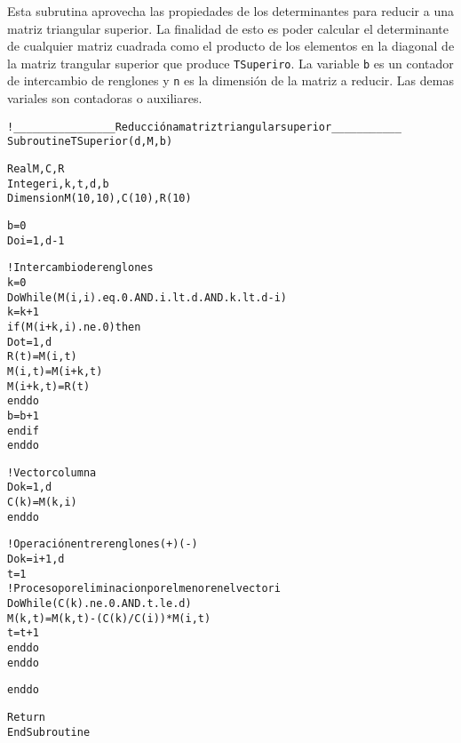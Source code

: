 \documentclass[a4paper]{scrartcl}
\begin{document}
Esta subrutina aprovecha las propiedades de los determinantes para reducir a una matriz triangular superior. La finalidad de esto es poder calcular el determinante de cualquier matriz cuadrada como el producto de los elementos en la diagonal de la matriz trangular superior que produce \texttt{TSuperiro}. La variable \texttt{b} es un contador de intercambio de renglones y \texttt{n} es la dimensión de la matriz a reducir. Las demas variales son contadoras o auxiliares.
\begin{alltt}
      !________________Reducción a matriz triangular superior___________
      Subroutine TSuperior(d,M,b)

      Real M,C,R
      Integer i,k,t,d,b
      Dimension M(10,10),C(10),R(10)

      b = 0
      Do i = 1, d - 1

         !Intercambio de renglones
         k = 0
         Do While (M(i,i).eq.0.AND.i.lt.d.AND.k.lt.d-i)
            k = k + 1
            if (M(i+k,i).ne.0) then
               Do t = 1, d
                  R(t) = M(i,t)
                  M(i,t) = M(i+k,t)
                  M(i+k,t) = R(t)
               end do
               b = b + 1
            end if
         end do

         !Vector columna
         Do k =  1, d
            C(k) = M(k,i)
         end do

         !Operación entre renglones (+)(-)
         Do k = i + 1, d
            t = 1
            !Proceso por eliminacion por el menor en el vector i
            Do While (C(k).ne.0.AND.t.le.d)
               M(k,t) = M(k,t) - (C(k)/C(i))*M(i,t)
               t = t + 1
            end do
         end do

      end do

      Return
      End Subroutine
\end{alltt}
\hline
\vspace{0.6cm}
\end{document}
